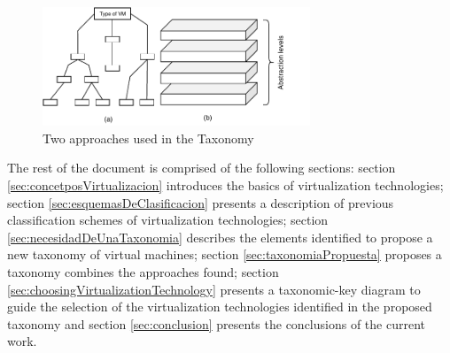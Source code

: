 
	\begin{figure}[H]
		\centering
		\includegraphics[width=8cm]{images/TwoApproaches.pdf}
		\vspace{-0.2cm}
		\caption{Two approaches used in the Taxonomy}
		\label{fig:twoApproaches}
	\end{figure}	
	
	The rest of the document is comprised of the following sections: section \ref{sec:concetposVirtualizacion} introduces the basics of virtualization technologies; section \ref{sec:esquemasDeClasificacion} presents a description of previous classification schemes of virtualization technologies; section \ref{sec:necesidadDeUnaTaxonomia} describes the elements identified to propose a new taxonomy of virtual machines; section \ref{sec:taxonomiaPropuesta} proposes a taxonomy combines the approaches found; section \ref{sec:choosingVirtualizationTechnology} presents a taxonomic-key diagram to guide the selection of the virtualization technologies identified in the proposed taxonomy and section \ref{sec:conclusion} presents the conclusions of the current work.
	